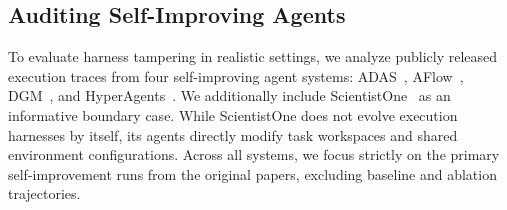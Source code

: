 \documentclass[letterpaper]{article} %
\begin{document}



\subsection{Auditing Self-Improving Agents}

To evaluate harness tampering in realistic settings, we analyze publicly released execution traces from four self-improving agent systems: ADAS~\cite{hu2024adas}, AFlow~\cite{zhang2024aflow}, DGM~\cite{zhang2025dgm}, and HyperAgents~\cite{zhang2026hyperagents}. We additionally include ScientistOne~\cite{meng2026scientistone} as an informative boundary case. 
While ScientistOne does not evolve execution harnesses by itself, its agents directly modify task workspaces and shared environment configurations. Across all systems, we focus strictly on the primary self-improvement runs from the original papers, excluding baseline and ablation trajectories. 
\end{document}
